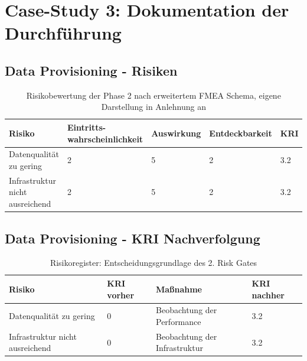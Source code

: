 \section{Case-Study 3: Dokumentation der Durchführung}
\label{appendix:case_study_3_documentation}


\subsection{Data Provisioning - Risiken} 
\label{appendix:cs3_phase2_risiken}

\begin{table}[H]
    \label{tab:cs3_phase2_risiken_tabelle}
    \centering
    \renewcommand{\arraystretch}{1.3}
    \begin{tabular}{|p{3cm}|p{3.5cm}|p{2.5cm}|p{3cm}|p{2.5cm}|}
    \hline
    \textbf{Risiko} & \textbf{Eintritts-wahrscheinlichkeit} & \textbf{Auswirkung} & \textbf{Entdeckbarkeit} & \textbf{KRI} \\
    \hline

    Datenqualität zu gering
    & 2 
    & 5
    & 2
    & 3.2 \\
    \hline

    Infrastruktur nicht ausreichend 
    & 2 
    & 5 
    & 2 
    & 3.2 \\
    \hline

    \end{tabular}
    \caption{Risikobewertung der Phase 2 nach erweitertem FMEA Schema, eigene Darstellung in Anlehnung an \citep{Bundesministerium_2018}}
\end{table}

\subsection{Data Provisioning - KRI Nachverfolgung}
\label{appendix:cs3_phase2_risiko_verfolgung}

\begin{table}[H]
    \label{tab:cs3_phase2_risiko_verfolgung_tabelle}
    \centering
    \renewcommand{\arraystretch}{1.3}
    \begin{tabular}{|p{3cm}|p{4.9cm}|p{3cm}|p{4.9cm}|}
    \hline
    \textbf{Risiko} & \textbf{KRI vorher} & \textbf{Maßnahme} & \textbf{KRI nachher} \\
    \hline

    Datenqualität zu gering
    & 0
    & Beobachtung der Performance
    & 3.2 \\
    \hline

    Infrastruktur nicht ausreichend 
    & 0
    & Beobachtung der Infrastruktur
    & 3.2 \\
    \hline

    \end{tabular}
    \caption{Risikoregister: Entscheidungsgrundlage des 2. Risk Gates}

\end{table}

